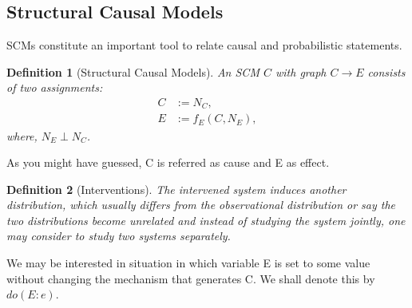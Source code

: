 \documentclass{article}
\newtheorem{definition}{Definition}[section]
\begin{document}
    \subsection{Structural Causal Models}
    SCMs constitute an important tool to relate causal and probabilistic statements.
    \begin{definition}[Structural Causal Models]
    An SCM $C$ with graph $C \rightarrow E$ consists of two assignments:
    \begin{align}
        C &:= N_C,\\
      \label{eq:Effect}  E &:= f_{E}(C,N_E),
    \end{align}
    where, $N_E \perp N_C$.
    \end{definition}
    As you might have guessed, C is referred as cause and E as effect.

    \begin{definition}[Interventions]
        The intervened system induces another distribution, which usually differs from the observational distribution or say the two distributions become unrelated and instead of studying the system jointly, one may consider to study two systems separately.
    \end{definition}
    We may be interested in situation in which variable E is set to some value without changing the mechanism that generates C. We shall denote this by $do(E:e)$.
\end{document}
